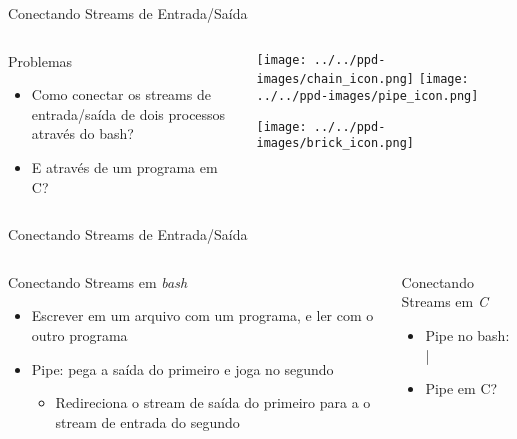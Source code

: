 \documentclass[10pt, compress, aspectratio=169, xcolor={table,usenames,dvipsnames}]{beamer}
\begin{document}
\begin{frame}[label={sec:org119ab29}]{Conectando Streams de Entrada/Saída}
\begin{columns}
\begin{column}{0.6\columnwidth}
\begin{block}{Problemas}
\begin{itemize}
\item Como \alert{conectar os streams} de entrada/saída de dois processos através do bash?
\item E através de um \alert{programa em C}?
\end{itemize}
\end{block}
\end{column}
\begin{column}{0.4\columnwidth}
\begin{center}
  \texttt{[image: ../../ppd-images/chain\_icon.png]}
  \texttt{[image: ../../ppd-images/pipe\_icon.png]}

  \vspace{1em}

  \texttt{[image: ../../ppd-images/brick\_icon.png]}
\end{center}
\end{column}
\end{columns}
\end{frame}
\begin{frame}[label={sec:org6ac37da},t,fragile]{Conectando Streams de Entrada/Saída}
\begin{columns}
\begin{column}{0.5\columnwidth}
\begin{block}{Conectando Streams em \emph{bash}}
\begin{itemize}
\item Escrever em um arquivo com um programa, e ler com o outro programa
\item Pipe: pega a saída do primeiro e joga no segundo
\begin{itemize}
\item Redireciona o  stream de  saída do primeiro  para a o  stream de  entrada do
segundo
\end{itemize}
\end{itemize}
\end{block}
\end{column}

\begin{column}{0.5\columnwidth}
\begin{block}{Conectando Streams em \emph{C}}
\begin{itemize}
\item Pipe no bash: |
\item Pipe em C?
\end{itemize}
\end{block}
\end{column}
\end{columns}
\end{frame}
\end{document}
